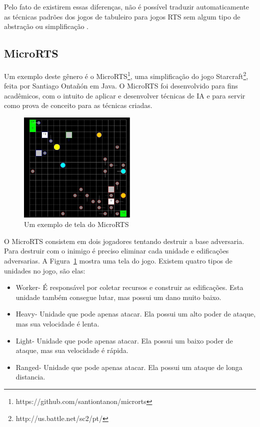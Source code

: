  
 Pelo fato de existirem essas diferenças, não é possível traduzir automaticamente as técnicas padrões dos jogos de tabuleiro para jogos RTS sem algum tipo de abstração ou simplificação \cite{ontanon2013survey}.
 
\subsection{MicroRTS}  
 
 Um exemplo deste gênero é o MicroRTS\footnote{https://github.com/santiontanon/microrts}, uma simplificação do jogo Starcraft\footnote{http://us.battle.net/sc2/pt/}, feita por Santiago Ontañón \cite{ontanon2013combinatorial} em Java. O MicroRTS foi desenvolvido para fins acadêmicos, com o intuito de aplicar e desenvolver técnicas de IA e para servir como prova de conceito para as técnicas criadas.
 
 \begin{figure}[ht]
 	\centering
 	\includegraphics[width=0.5\textwidth]{fig/microrts.pdf}
 	\caption{Um exemplo de tela do MicroRTS}
 	\label{fig:microrts}
 \end{figure} 
 
O MicroRTS consistem em dois jogadores tentando destruir a base adversaria. Para destruir com o inimigo é preciso eliminar cada unidade e edificações adversarias. A Figura~\ref{fig:microrts} mostra uma tela do jogo. Existem quatro tipos de unidades no jogo, são elas:
  
\begin{itemize}
 	\item Worker- É responsável por coletar recursos e construir as edificações. Esta unidade também consegue lutar, mas possui um dano muito baixo.
 	\item Heavy- Unidade que pode apenas atacar. Ela possui um alto poder de ataque, mas sua velocidade é lenta.
 	\item Light- Unidade que pode apenas atacar. Ela possui um baixo poder de ataque, mas sua velocidade é rápida.
 	\item Ranged- Unidade que pode apenas atacar. Ela possui um ataque de longa distancia. 
\end{itemize} 
 
